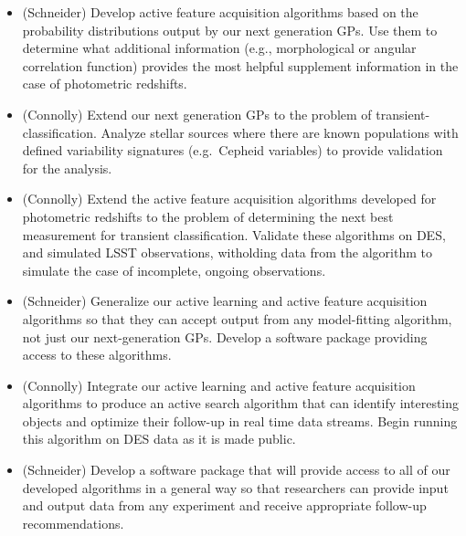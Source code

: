 \documentclass[prd,nofootbib,floatfix,11pt,tightenlines,nofootinbib]{revtex4}
\begin{document}
\vspace{.5\baselineskip}
\begin{itemize}

\item (Schneider)
Develop active feature acquisition algorithms based on the probability distributions
output by our next generation GPs.  Use them to determine what additional
information (e.g., morphological or angular correlation function) provides the most
helpful supplement information in the case of photometric redshifts.

\item (Connolly) Extend our next generation GPs to the problem of 
transient-classification.  Analyze stellar
 sources where there are known populations with defined variability
 signatures (e.g.\ Cepheid variables) to provide validation for the
 analysis.

\item (Connolly) Extend the active feature acquisition algorithms developed for photometric
redshifts to the problem of determining the next best measurement for transient
classification.
Validate these algorithms on DES, and simulated LSST observations, witholding
data from the algorithm to simulate the case of incomplete, ongoing observations.

\item (Schneider) 
Generalize our active learning and active feature acquisition algorithms so that
they can accept output from any model-fitting algorithm, not just our next-generation
GPs.  Develop a software package providing access to these algorithms.

\end{itemize}
\vspace{.5\baselineskip}

 \vspace{.5\baselineskip}

\begin{itemize}

\item (Connolly)
Integrate our active learning and active feature acquisition algorithms to
produce an active search algorithm that can identify interesting objects and optimize
their follow-up in real time data streams.  Begin running this algorithm on DES data
as it is made public.

\item (Schneider) Develop a software package that will provide access to all of our
developed algorithms in a general way so that researchers can provide input and output
data from any experiment and receive appropriate follow-up recommendations.

\end{itemize}
\end{document}
